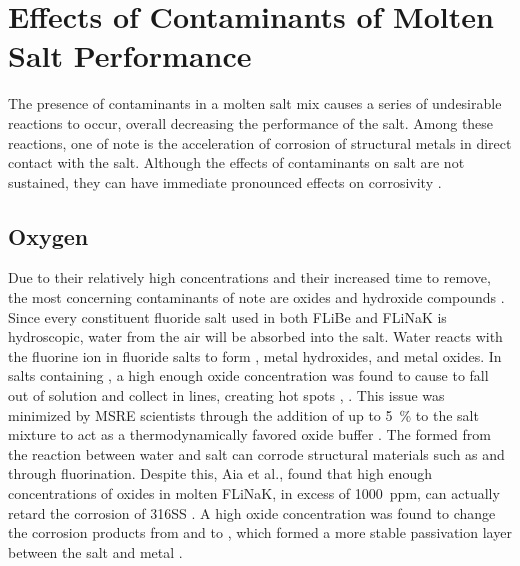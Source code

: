 %
%

\section{Effects of Contaminants of Molten Salt Performance}
\label{sec: contaminants}

The presence of contaminants in a molten salt mix causes a series of
undesirable reactions to occur, overall decreasing the performance of the
salt. Among these reactions, one of note is the acceleration of corrosion of
structural metals in direct contact with the salt. Although the effects of
contaminants on salt are not sustained, they can have immediate pronounced
effects on corrosivity \cite{rev23}. \par

\subsection{Oxygen}
\label{sec: oxygen}

Due to their relatively high concentrations and their increased time to remove,
the most concerning contaminants of note are oxides and hydroxide
compounds \cite{rev18}. Since every constituent fluoride salt used in both
FLiBe and FLiNaK is hydroscopic, water from the air will be absorbed into the
salt. Water reacts with the fluorine ion in fluoride salts to form
, metal
hydroxides, and metal oxides. In salts containing , a high enough oxide
concentration was found to cause  to fall out of solution and collect in
lines, creating hot spots \cite{rev10}, \cite{rev21}. This issue was
minimized by MSRE scientists through the addition of up to \SI{5}{\percent}
 to the salt mixture to
act as a thermodynamically favored oxide buffer \cite{rev21}. The
 formed from the reaction between water and salt can corrode structural
materials such as  and  through fluorination. Despite this,
Aia et al., found that high enough concentrations of oxides in molten FLiNaK,
in excess of \SI{1000}{ppm}, can
actually retard the corrosion of 316SS \cite{rev24}. A high oxide concentration
was found to change the corrosion products from  and  to
, which formed a more stable passivation layer between the salt and
metal \cite{rev24}. \par

